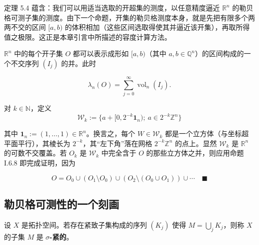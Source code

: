 定理 5.4 蕴含：我们可以用适当选取的开超集的测度，以任意精度逼近 $ \mathbb{R}^n $ 的勒贝格可测子集的测度。由下一个命题，开集的勒贝格测度本身，就是先把有限多个两两不交的区间 $ [a, b) $ 的体积相加（这些区间选取得使其并逼近该开集），再取所得值之极限。这正是本章引言中所描述的容度计算方法。

\begin{proposition}

$ \mathbb{R}^n $ 中的每个开子集 $ O $ 都可以表示成形如 $ [a, b) $（其中 $ a, b \in \mathbb{Q}^n $）的区间构成的一个不交序列 $ (I_j) $ 的并。此时

\[
\lambda_n(O) = \sum_{j=0}^{\infty} \operatorname{vol}_n(I_j) .
\]

\proofhead
对 $ k \in \mathbb{N} $，定义
\[
\mathcal{W}_k := \{ a + [0, 2^{-k}\mathbf{1}_n) ; \ a \in 2^{-k}\mathbb{Z}^n \}
\]

其中 $ \mathbf{1}_n := (1, \ldots, 1) \in \mathbb{R}^n $。换言之，每个 $ W \in \mathcal{W}_k $ 都是一个立方体（与坐标超平面平行），其棱长为 $ 2^{-k} $，其“左下角”落在网格 $ 2^{-k}\mathbb{Z}^n $ 的点上。显然 $ \mathcal{W}_k $ 是 $ \mathbb{R}^n $ 的可数不交覆盖。若 $ O_k $ 是 $ \mathcal{W}_k $ 中完全含于 $ O $ 的那些立方体之并，则应用命题 I.6.8 即完成证明，因为

\[
O = O_0 \cup (O_1 \setminus O_0) \cup (O_2 \setminus (O_0 \cup O_1)) \cup \cdots\quad\blacksquare
\]
\end{proposition}

\subsection*{勒贝格可测性的一个刻画}

设 $ X $ 是拓扑空间。若存在紧致子集构成的序列 $ (K_j) $ 使得 $ M = \bigcup_j K_j $，则称 $ X $ 的子集 $ M $ 是 \textbf{$ \sigma $-紧的}。

